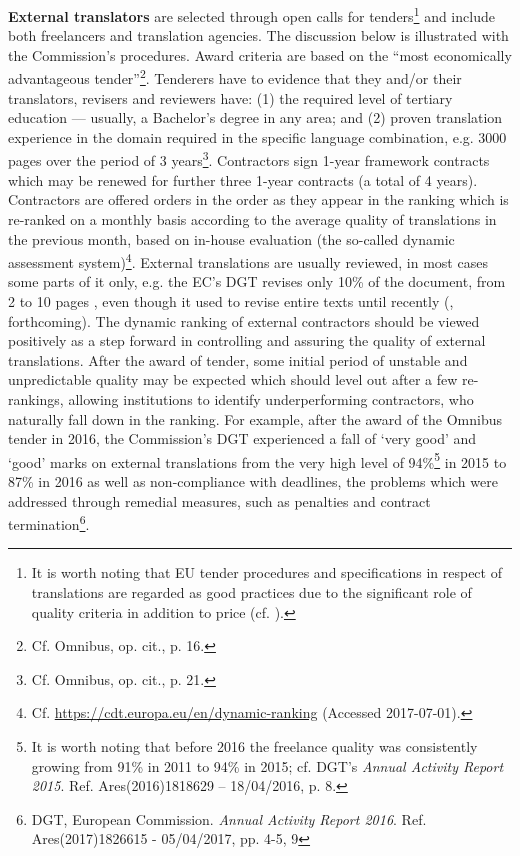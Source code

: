 \documentclass[output=paper]{langsci/langscibook}
\begin{document}
\textbf{External translators} are selected through open calls for tenders\footnote{It is worth noting that EU tender procedures and specifications in respect of translations are regarded as good practices due to the significant role of quality criteria in addition to price (cf. \citealt{Wołoszyk2017}).} and include both freelancers and translation agencies. The discussion below is illustrated with the Commission’s procedures. Award criteria are based on the “most economically advantageous tender”\footnote{Cf. Omnibus, op. cit., p. 16.}. Tenderers have to evidence that they and/or their translators, revisers and reviewers have: (1) the required level of tertiary education — usually, a Bachelor’s degree in any area; and (2) proven translation experience in the domain required in the specific language combination, e.g. 3000 pages over the period of 3 years\footnote{Cf. Omnibus, op. cit., p. 21.}. Contractors sign 1-year framework contracts which may be renewed for further three 1-year contracts (a total of 4 years). Contractors are offered orders in the order as they appear in the ranking which is re-ranked on a monthly basis according to the average quality of translations in the previous month, based on in-house evaluation (the so-called dynamic assessment system)\footnote{Cf. \url{https://cdt.europa.eu/en/dynamic-ranking} (Accessed 2017-07-01).}. External translations are usually reviewed, in most cases some parts of it only, e.g. the EC’s DGT revises only 10\% of the document, from 2 to 10 pages \citep[17]{DGT2012}, even though it used to revise entire texts until recently (\citealt{Strandvik2017}, forthcoming). The dynamic ranking of external contractors should be viewed positively as a step forward in controlling and assuring the quality of external translations. After the award of tender, some initial period of unstable and unpredictable quality may be expected which should level out after a few re{}-rankings, allowing institutions to identify underperforming contractors, who naturally fall down in the ranking. For example, after the award of the Omnibus tender in 2016, the Commission’s DGT experienced a fall of ‘very good’ and ‘good’ marks on external translations from the very high level of  94\%\footnote{It is worth noting that before 2016 the freelance quality was consistently growing from 91\% in 2011 to 94\% in 2015; cf. DGT’s \textit{Annual Activity Report 2015}. Ref. Ares(2016)1818629 – 18/04/2016, p. 8.} in 2015 to 87\% in 2016 as well as non-compliance with deadlines, the problems which were addressed through remedial measures, such as penalties and contract termination\footnote{DGT, European Commission. \textit{Annual Activity Report 2016}. Ref. Ares(2017)1826615 - 05/04/2017, pp. 4-5, 9}.
\end{document}

